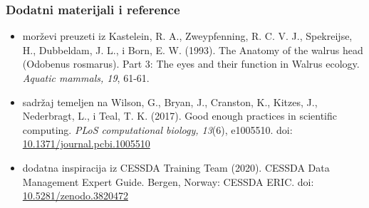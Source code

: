 \documentclass[aspectratio=169]{beamer}
\newenvironment{noheadline}{
    \setbeamertemplate{headline}{}
}{}
\begin{document}
\begin{noheadline}
    \begin{frame}
        \frametitle{Dodatni materijali i reference}

        \begin{itemize}
            \setlength{\itemsep}{1em}
            
            \item morževi preuzeti iz Kastelein, R. A., Zweypfenning, R. C. V.
                J., Spekreijse, H., Dubbeldam, J. L., i Born, E. W. (1993). The
                Anatomy of the walrus head (Odobenus rosmarus). Part 3: The eyes
                and their function in Walrus ecology. \textit{Aquatic mammals, 19},
                61-61.

            \item sadržaj temeljen na Wilson, G., Bryan, J., Cranston, K.,
                Kitzes, J., Nederbragt, L., i Teal, T. K. (2017). Good enough
                practices in scientific computing. \textit{PLoS computational biology,
                13}(6), e1005510. doi: \url{10.1371/journal.pcbi.1005510}

            \item dodatna inspiracija iz CESSDA Training Team (2020). CESSDA
                Data Management Expert Guide. Bergen, Norway: CESSDA ERIC. doi:
                \url{10.5281/zenodo.3820472}
            
        \end{itemize}
    \end{frame}
\end{noheadline}
\end{document}
